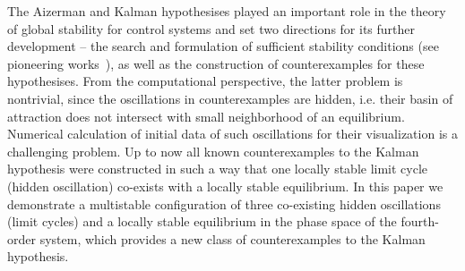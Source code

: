\documentclass{ifacconf}
\theoremstyle{plain}
\begin{document}
The Aizerman and Kalman hypothesises played an important role in
the theory of global stability for control systems
and set two directions for its further development --
the search and formulation of sufficient stability conditions
(see pioneering works~\citep{Popov-1961,Kal63,GeligLY-1978}),
as well as the construction of counterexamples for these hypothesises.
From the computational perspective, the latter problem is nontrivial,
since the oscillations in counterexamples are hidden,
i.e. their basin of attraction does not intersect with small neighborhood of an equilibrium.
Numerical calculation of initial data of such oscillations for their visualization
is a challenging problem.
Up to now all known counterexamples to the Kalman hypothesis were constructed in such a way
that one locally stable limit cycle (hidden oscillation) co-exists with a locally stable equilibrium.
In this paper we demonstrate a multistable configuration of three co-existing hidden oscillations (limit cycles)
and a locally stable equilibrium
in the phase space of the fourth-order system, which provides a new class of counterexamples
to the Kalman hypothesis.
\end{document}
